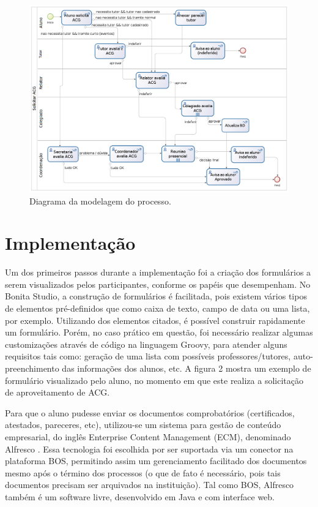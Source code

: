 \documentclass[12pt]{article}
\begin{document}
\begin{figure}[ht]
\centering
\includegraphics[width=.99\textwidth]{images/processo.png}
\caption{Diagrama da modelagem do processo.}
\label{fig:Fig1}
\end{figure}

\section{Implementação}

Um dos primeiros passos durante a implementação foi a criação dos formulários a serem visualizados pelos participantes, conforme os papéis que desempenham. No Bonita Studio, a construção de formulários é facilitada, pois existem vários tipos de elementos pré-definidos que como caixa de texto, campo de data ou uma lista, por exemplo. Utilizando dos elementos citados, é possível construir rapidamente um formulário. Porém, no caso prático em questão, foi necessário realizar algumas customizações através de código na linguagem Groovy, para atender alguns requisitos tais como: geração de uma lista com possíveis professores/tutores, auto-preenchimento das informações dos alunos, etc. A figura 2 mostra um exemplo de formulário visualizado pelo aluno, no momento em que este realiza a solicitação de aproveitamento de ACG.

Para que o aluno pudesse enviar os documentos comprobatórios (certificados, atestados, pareceres, etc), utilizou-se um sistema para gestão de conteúdo empresarial, do inglês Enterprise Content Management (ECM), denominado Alfresco \cite{ALFRESCO}. Essa tecnologia foi escolhida por ser suportada via um conector na plataforma BOS, permitindo assim um gerenciamento facilitado dos documentos mesmo após o término dos processos (o que de fato é necessário, pois tais documentos precisam ser arquivados na instituição). Tal como BOS, Alfresco também é um software livre, desenvolvido em Java e com interface web.
\end{document}
